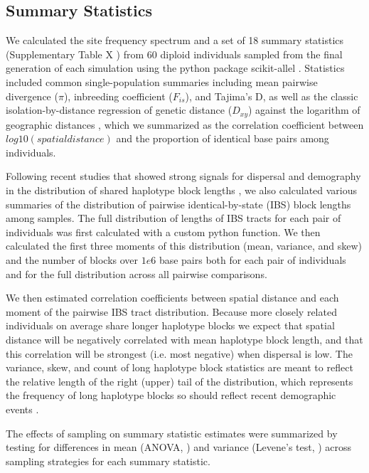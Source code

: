 \documentclass[9pt,twocolumn,twoside,lineno]{gsajnl}
\newif\ifcomments
\newcommand{\cjb}[1]{\ifcomments{{\color{blue} \it (#1)}}\else{}\fi}
\begin{document}
\subsection{Summary Statistics}
We calculated the site frequency spectrum and a set of 18 summary statistics (Supplementary Table X \cjb{working on this}) from 60 diploid individuals sampled from the final generation of each simulation using the python package scikit-allel \citep{Miles2017}. Statistics included common single-population summaries including mean pairwise divergence ($\pi$), inbreeding coefficient ($F_{is}$), and Tajima's D, as well as the classic isolation-by-distance regression of genetic distance ($D_{xy}$) against the logarithm of geographic distances \citep{Rousset1997}, which we summarized as the correlation coefficient between $log10(spatial distance)$ and the proportion of identical base pairs among individuals. 

Following recent studies that showed strong signals for dispersal and demography in the distribution of shared haplotype block lengths \citep{Ringbauer2017,Baharian2016}, we also calculated various summaries of the distribution of pairwise identical-by-state (IBS) block lengths among samples. The full distribution of lengths of IBS tracts for each pair of individuals was first calculated with a custom python function. We then calculated the first three moments of this distribution (mean, variance, and skew) and the number of blocks over $1e6$ base pairs both for each pair of individuals and for the full distribution across all pairwise comparisons. 

We then estimated correlation coefficients between spatial distance and each moment of the pairwise IBS tract distribution. Because more closely related individuals on average share longer haplotype blocks we expect that spatial distance will be negatively correlated with mean haplotype block length, and that this correlation will be strongest (i.e. most negative) when dispersal is low. The variance, skew, and count of long haplotype block statistics are meant to reflect the relative length of the right (upper) tail of the distribution, which represents the frequency of long haplotype blocks so should reflect recent demographic events \citep{Ringbauer2017}. 

The effects of sampling on summary statistic estimates were summarized by testing for differences in mean (ANOVA, \citep{Rcore2018}) and variance (Levene's test, \citep{Fox2011}) across sampling strategies for each summary statistic. 
\end{document}
